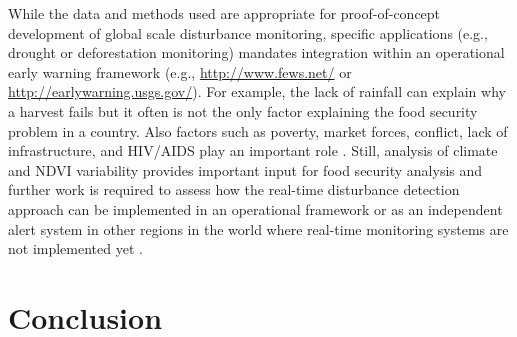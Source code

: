 \documentclass[authoryear,preprint,review,10pt]{elsarticle}
\begin{document}
\begin{enumerate}[(1)]

\end{enumerate}

While the data and methods used are appropriate for proof-of-concept development of global scale disturbance monitoring, specific applications (e.g., drought or deforestation monitoring) mandates integration within an operational early warning framework (e.g., \url{http://www.fews.net/} or \url{http://earlywarning.usgs.gov/}). For example, the lack of rainfall can explain why a harvest fails but it often is not the only factor explaining the food security problem in a country.  Also factors such as poverty, market forces, conflict, lack of infrastructure, and HIV/AIDS play an important role \citep{Funk:2011fg, Vrieling:2011da}. Still, analysis of climate and NDVI variability provides important input for food security analysis and further work is required to assess how the real-time disturbance detection approach can be implemented in an operational framework or as an independent alert system in other regions in the world where real-time monitoring systems are not implemented yet \citep{Asner:2011fa}. 

\section{Conclusion}
\end{document}
